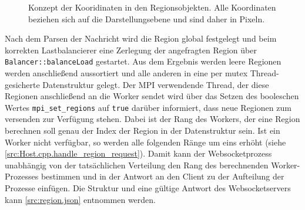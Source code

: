 \begin{figure}
	
\end{figure}

\begin{figure}
    \caption{Konzept der Kooridinaten in den Regionsobjekten. Alle Koordinaten beziehen sich auf die Darstellungsebene und sind daher in Pixeln.}
    \label{fig:concept_coordinates}
\end{figure}


Nach dem Parsen der Nachricht wird die Region global festgelegt und beim korrekten Lastbalancierer eine Zerlegung der angefragten Region über \verb|Balancer::balanceLoad| gestartet.
Aus dem Ergebnis werden leere Regionen werden anschließend aussortiert und alle anderen in eine per mutex Thread-gesicherte Datenstruktur
gelegt. Der MPI verwendende Thread, der diese Regionen anschließend an die Worker sendet wird über das Setzen des booleschen Wertes \verb|mpi_set_regions|
auf \verb|true| darüber informiert, dass neue Regionen zum versenden zur Verfügung stehen.
Dabei ist der Rang des Workers, der eine Region berechnen soll genau der Index der Region in der Datenstruktur sein.
Ist ein Worker nicht verfügbar, so werden alle folgenden Ränge um eins erhöht (siehe \autoref{src:Host.cpp.handle_region_request}).
Damit kann der Websocketprozess unabhängig von der tatsächlichen Verteilung den Rang des berechnenden Worker-Prozesses
bestimmen und in der Antwort an den Client zu der Aufteilung der Prozesse einfügen.
Die Struktur und eine gültige Antwort des Websocketservers kann \autoref{src:region.json} entnommen werden.

